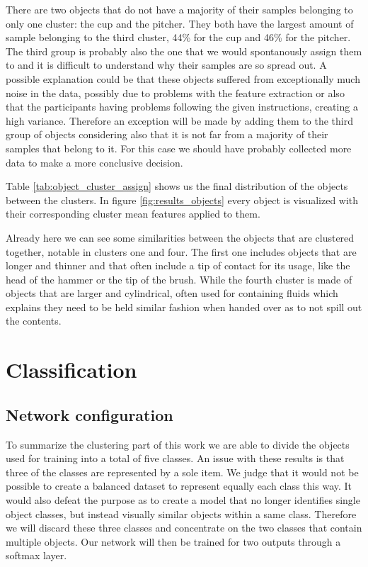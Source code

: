 There are two objects that do not have a majority of their samples belonging to only one cluster: the cup and the pitcher. They both have the largest amount of sample belonging to the third cluster, 44\% for the cup and 46\% for the pitcher. The third group is probably also the one that we would spontanously assign them to and it is difficult to understand why their samples are so spread out. A possible explanation could be that these objects suffered from exceptionally much noise in the data, possibly due to problems with the feature extraction or also that the participants having problems following the given instructions, creating a high variance. Therefore an exception will be made by adding them to the third group of objects considering also that it is not far from a majority of their samples that belong to it. For this case we should have probably collected more data to make a more conclusive decision.

Table \ref{tab:object_cluster_assign} shows us the final distribution of the objects between the clusters. In figure \ref{fig:results_objects} every object is visualized with their corresponding cluster mean features applied to them.

Already here we can see some similarities between the objects that are clustered together, notable in clusters one and four. The first one includes objects that are longer and thinner and that often include a tip of contact for its usage, like the head of the hammer or the tip of the brush. While the fourth cluster is made of objects that are larger and cylindrical, often used for containing fluids which explains they need to be held similar fashion when handed over as to not spill out the contents.



%

\section{Classification}

\subsection{Network configuration}
\label{sec:res_setup}

To summarize the clustering part of this work we are able to divide the objects used for training into a total of five classes. An issue with these results is that three of the classes are represented by a sole item. We judge that it would not be possible to create a balanced dataset to represent equally each class this way. It would also defeat the purpose as to create a model that no longer identifies single object classes, but instead visually similar objects within a same class. Therefore we will discard these three classes and concentrate on the two classes that contain multiple objects. Our network will then be trained for two outputs through a softmax layer.

